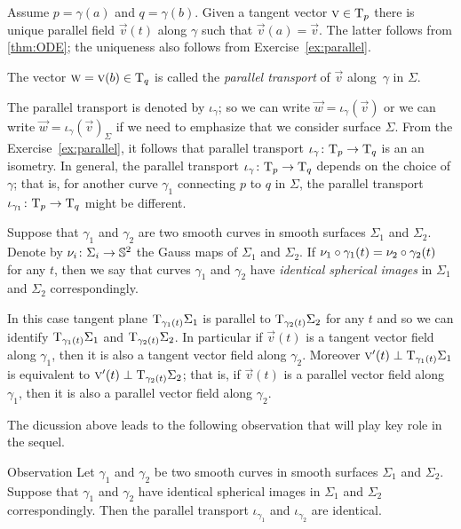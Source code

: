 Assume $p=\gamma(a)$ and $q=\gamma(b)$.
Given a tangent vector ${\textsc v}\in\mathrm{T}_p$ there is unique parallel field ${\vec v}(t)$ along $\gamma$ such that ${\vec v}(a)={\vec v}$.
The latter follows from \ref{thm:ODE}; the uniqueness also follows from Exercise~\ref{ex:parallel}.

The vector $\textsc w={\textsc v}(b)\in\mathrm{T}_q$ is called the \emph{parallel transport} of ${\vec v}$ along~$\gamma$ in $\Sigma$.

The parallel transport is denoted by $\iota_\gamma$;
so we can write $\vec w=\iota_\gamma({\vec v})$ or we can write $\vec w=\iota_\gamma({\vec v})_\Sigma$ if we need to emphasize that we consider surface $\Sigma$.
From the Exercise~\ref{ex:parallel}, it follows that parallel transport $\iota_\gamma\:\T_p\z\to\T_q$ is an an isometry.
In general, the parallel transport $\iota_\gamma\:\T_p\z\to\T_q$ depends on the choice of $\gamma$; that is, for another curve $\gamma_1$ connecting $p$ to $q$ in $\Sigma$, the parallel transport $\iota_{\gamma_1}\colon\mathrm{T}_p\to\mathrm{T}_q$ might be different.

Suppose that $\gamma_1$ and $\gamma_2$ are two smooth curves in smooth surfaces $\Sigma_1$ and $\Sigma_2$.
Denote by $\nu_i\colon\Sigma_i\to\mathbb{S}^2$ the Gauss maps of $\Sigma_1$ and $\Sigma_2$.
If $\nu_1\circ\gamma_1(t)= \nu_2\circ\gamma_2(t)$ for any $t$, then we say that curves $\gamma_1$ and $\gamma_2$ have \emph{identical spherical images} in $\Sigma_1$ and $\Sigma_2$ correspondingly.

In this case tangent plane $\mathrm{T}_{\gamma_1(t)}\Sigma_1$ is parallel to $\mathrm{T}_{\gamma_2(t)}\Sigma_2$ for any $t$ and so we can identify $\mathrm{T}_{\gamma_1(t)}\Sigma_1$ and $\mathrm{T}_{\gamma_2(t)}\Sigma_2$.
In particular if $\vec v(t)$ is a tangent vector field along $\gamma_1$,
then it is also a tangent vector field along $\gamma_2$.
Moreover $\textsc v'(t)\perp \mathrm{T}_{\gamma_1(t)}\Sigma_1$ is equivalent to $\textsc v'(t)\perp \mathrm{T}_{\gamma_2(t)}\Sigma_2$; that is, if $\vec v(t)$ is a parallel vector field along $\gamma_1$,
then it is also a parallel vector field along $\gamma_2$.

The dicussion above leads to the following observation that will play key role in the sequel.

\begin{thm}{Observation}\label{obs:parallel=}
Let $\gamma_1$ and $\gamma_2$ be two smooth curves in smooth surfaces $\Sigma_1$ and $\Sigma_2$.
Suppose that $\gamma_1$ and $\gamma_2$ have identical spherical images in $\Sigma_1$ and $\Sigma_2$ correspondingly.
Then the parallel transport $\iota_{\gamma_1}$ and $\iota_{\gamma_2}$ are identical. 
\end{thm}

